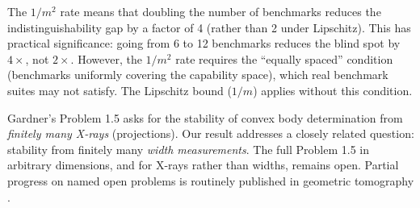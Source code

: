 \begin{remark}
The $1/m^2$ rate means that doubling the number of benchmarks reduces the indistinguishability gap by a factor of 4 (rather than 2 under Lipschitz). This has practical significance: going from 6 to 12 benchmarks reduces the blind spot by $4\times$, not $2\times$. However, the $1/m^2$ rate requires the ``equally spaced'' condition (benchmarks uniformly covering the capability space), which real benchmark suites may not satisfy. The Lipschitz bound ($1/m$) applies without this condition.
\end{remark}

\begin{remark}
Gardner's Problem 1.5 asks for the stability of convex body determination from \emph{finitely many X-rays} (projections). Our result addresses a closely related question: stability from finitely many \emph{width measurements}. The full Problem 1.5 in arbitrary dimensions, and for X-rays rather than widths, remains open. Partial progress on named open problems is routinely published in geometric tomography \cite{gardner2006geometric}.
\end{remark}

